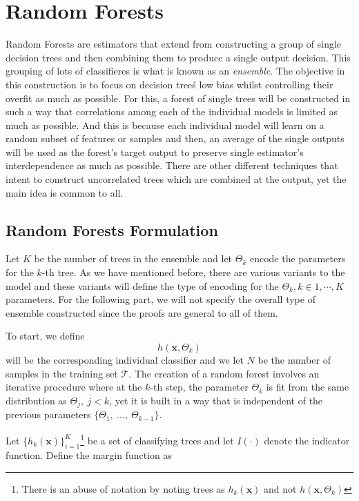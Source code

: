 \section{ Random Forests}\label{section:random_forests}

Random Forests are estimators that extend from constructing a group of single decision trees and then combining them to produce a single output decision. 
This grouping of lots of classifieres is what is known as an \textit{ensemble}.
The objective in this construction is to focus on decision tree\'s low bias whilst controlling their overfit as much as possible.
For this, a forest of single trees will be constructed in such a way that correlations among each of the individual models is limited as much as possible.
And this is because each individual model will learn on a random subset of features or samples and then, an average of the single outputs will be used as the forest's target output to preserve single estimator's interdependence as much as possible.
There  are other different techniques that intent to construct uncorrelated trees which are combined at the output, yet the main idea is common to all.

\subsection{ Random Forests Formulation}\label{subsection:random_forests_formulation}

Let $K$ be the number of trees in the ensemble and let $\Theta_k$ encode the parameters for the $k$-th tree.
As we have mentioned before, there are various variants to the model and these variants will define the type of encoding for the $\Theta_k, k \in {1,\cdots,K}$  parameters.
For the following part, we will not specify the overall type of ensemble constructed since the  proofs are general to all of them.

To start, we define  
$$h(\textbf{x},\Theta_k)$$ will be the corresponding individual classifier and we let $N$ be the number of samples in the training set $\mathcal{T}$.
The creation of a random forest involves an iterative procedure where at the $k$-th step, the parameter $\Theta_k$ is fit from the same distribution as $\Theta_j, \ j<k$, yet it is built in a way that is independent of the previous parameters $\{\Theta_1, \ \ldots, \ \Theta_{k-1} \}$. %


Let $\{ h_k(\textbf{x}) \}_{i=1}^K$\footnote{There is an abuse of notation by noting trees as $h_k(\textbf{x})$ and not $h(\textbf{x}, \Theta_k)$ } be a set of classifying trees and let $I(\cdot)$ denote the indicator function.
Define the margin function as

